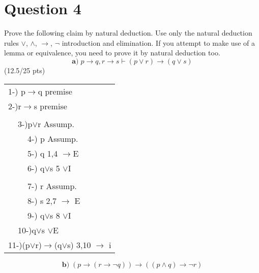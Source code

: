 \documentclass[a4paper,12pt]{article}
\newcommand\tab[1][1cm]{\hspace*{#1}}
\begin{document}
\section*{Question 4 \hfill {}}
\tab Prove the following claim by natural deduction. Use only the natural deduction rules $\vee$, $\wedge$, $\rightarrow$, $\neg$ introduction and elimination. If you attempt to make use of a lemma or equivalence, you need to prove it by natural deduction too.
\begin{equation*}
    \textbf{a)} \; p \rightarrow q, r \rightarrow s \vdash (p \vee r) \rightarrow (q \vee s)
\end{equation*}
\hfill \small{(12.5/25 pts)}\\
\begin{tcolorbox}
\begin{tabular}{|l|llllll|l|}
\hline
\multicolumn{8}{|l|}{1-) p$\rightarrow$q premise}                                 \\
\multicolumn{8}{|l|}{2-)r$\rightarrow$s premise}                                 \\
\multicolumn{8}{|l|}{}                                 \\ \cline{2-7}
 & \multicolumn{6}{l|}{3-)p$\lor$r Assump.}                            &  \\ \cline{3-6}
 & \multicolumn{1}{l|}{} & \multicolumn{4}{l|}{4-) p Assump.} &  &  \\
 & \multicolumn{1}{l|}{} & \multicolumn{4}{l|}{5-) q 1,4 $\rightarrow$E} &  &  \\
 & \multicolumn{1}{l|}{} & \multicolumn{4}{l|}{6-) q$\lor$s 5 $\lor$I } &  &  \\ \cline{3-6}
 &                       &     &     &     &     &  &  \\ \cline{3-6}
 & \multicolumn{1}{l|}{} & \multicolumn{4}{l|}{7-) r Assump.} &  &  \\
 & \multicolumn{1}{l|}{} & \multicolumn{4}{l|}{8-) s 2,7 $\rightarrow$ E} &  &  \\
 & \multicolumn{1}{l|}{} & \multicolumn{4}{l|}{9-) q$\lor$s 8 $\lor$I} &  &  \\ \cline{3-6}
 & \multicolumn{6}{l|}{10-)q$\lor$s $\lor$E}                            &  \\ \cline{2-7}
\multicolumn{8}{|l|}{11-)(p$\lor$r)$\rightarrow$(q$\lor$s) 3,10 $\rightarrow$ i}                                 \\ \hline
\end{tabular}
\vspace{1cm} %
\end{tcolorbox}
\begin{equation*}
     \textbf{b)} \;  (p \rightarrow (r \rightarrow \neg q)) \rightarrow ((p \wedge q) \rightarrow \neg r)
\end{equation*}
\end{document}
